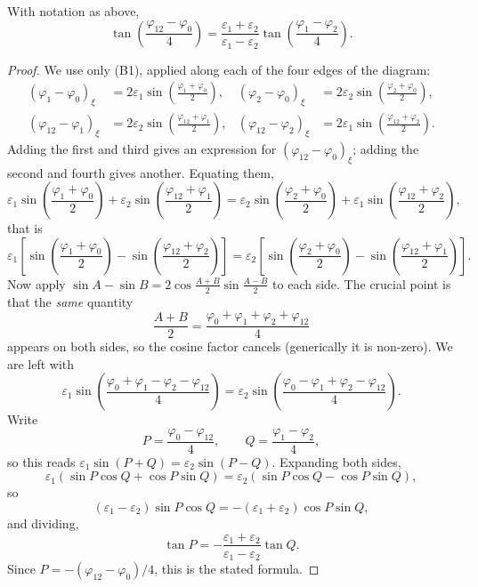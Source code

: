 \begin{theorem}
	With notation as above,
	$$
	\tan\left(\frac{\varphi_{12}-\varphi_0}{4}\right) = \frac{\varepsilon_1+\varepsilon_2}{\varepsilon_1-\varepsilon_2}\tan\left(\frac{\varphi_1-\varphi_2}{4}\right).
	$$
\end{theorem}
\begin{proof}
	We use only (B1), applied along each of the four edges of the diagram:
	\begin{align*}
		\left(\varphi_1-\varphi_0\right)_\xi &= 2\varepsilon_1\sin\left(\frac{\varphi_1+\varphi_0}{2}\right), &
		\left(\varphi_2-\varphi_0\right)_\xi &= 2\varepsilon_2\sin\left(\frac{\varphi_2+\varphi_0}{2}\right),\\
		\left(\varphi_{12}-\varphi_1\right)_\xi &= 2\varepsilon_2\sin\left(\frac{\varphi_{12}+\varphi_1}{2}\right), &
		\left(\varphi_{12}-\varphi_2\right)_\xi &= 2\varepsilon_1\sin\left(\frac{\varphi_{12}+\varphi_2}{2}\right).
	\end{align*}
	Adding the first and third gives an expression for $(\varphi_{12}-\varphi_0)_\xi$; adding the second and fourth gives another. Equating them,
	$$
	\varepsilon_1\sin\left(\frac{\varphi_1+\varphi_0}{2}\right) + \varepsilon_2\sin\left(\frac{\varphi_{12}+\varphi_1}{2}\right) = \varepsilon_2\sin\left(\frac{\varphi_2+\varphi_0}{2}\right) + \varepsilon_1\sin\left(\frac{\varphi_{12}+\varphi_2}{2}\right),
	$$
	that is
	$$
	\varepsilon_1\left[\sin\left(\frac{\varphi_1+\varphi_0}{2}\right) - \sin\left(\frac{\varphi_{12}+\varphi_2}{2}\right)\right] = \varepsilon_2\left[\sin\left(\frac{\varphi_2+\varphi_0}{2}\right) - \sin\left(\frac{\varphi_{12}+\varphi_1}{2}\right)\right].
	$$
	Now apply $\sin A - \sin B = 2\cos\frac{A+B}{2}\sin\frac{A-B}{2}$ to each side. The crucial point is that the \emph{same} quantity
	$$
	\frac{A+B}{2} = \frac{\varphi_0+\varphi_1+\varphi_2+\varphi_{12}}{4}
	$$
	appears on both sides, so the cosine factor cancels (generically it is non-zero). We are left with
	$$
	\varepsilon_1\sin\left(\frac{\varphi_0+\varphi_1-\varphi_2-\varphi_{12}}{4}\right) = \varepsilon_2\sin\left(\frac{\varphi_0-\varphi_1+\varphi_2-\varphi_{12}}{4}\right).
	$$
	Write
	$$
	P = \frac{\varphi_0-\varphi_{12}}{4}, \qquad Q = \frac{\varphi_1-\varphi_2}{4},
	$$
	so this reads $\varepsilon_1\sin(P+Q) = \varepsilon_2\sin(P-Q)$. Expanding both sides,
	$$
	\varepsilon_1\left(\sin P\cos Q + \cos P\sin Q\right) = \varepsilon_2\left(\sin P\cos Q - \cos P\sin Q\right),
	$$
	so
	$$
	\left(\varepsilon_1-\varepsilon_2\right)\sin P\cos Q = -\left(\varepsilon_1+\varepsilon_2\right)\cos P\sin Q,
	$$
	and dividing,
	$$
	\tan P = -\frac{\varepsilon_1+\varepsilon_2}{\varepsilon_1-\varepsilon_2}\tan Q.
	$$
	Since $P = -(\varphi_{12}-\varphi_0)/4$, this is the stated formula.
\end{proof}

